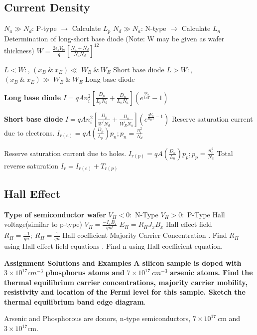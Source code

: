 \begin{multicols}{3}
\subsection{Current Density}
$N_a \gg N_d$: P-type $\rightarrow$ Calculate $L_p$ \hfill \break
$N_d \gg N_a$: N-type $\rightarrow$ Calculate $L_n$ \hfill \break
Determination of long-short base diode
(Note: W may be given as wafer thickness) $W=\frac{2\epsilon_s V_{bi	}}{q} \left[\frac{N_a+N_d}{N_aN_d}
\right]^{12}$ 

$L < W:$, $(x_B \ \&  \ x_E) \ll  \ W_B \ \& \ W_E $ Short base diode \hfill \break
$L > W:$, $(x_B \ \&  \ x_E)  \gg\ W_B \ \& \ W_E $ Long base diode %

\textbf{Long base diode} \hfill \break 
$I=qAn_i^2 \left[\frac{D_p}{L_p N_d}+\frac{D_n}{L_n N_a}\right] \left(e^{\frac{qV_a}{k_BT}}-1 \right)$ \hfill \break 

\textbf{Short base diode} \hfill \break 
$I=qAn_i^2 \left[\frac{D_p}{W^\prime N_d}+\frac{D_n}{W_E^\prime N_a}\right] \left(e^{\frac{qV_a}{k_BT}-1} \right)$ \hfill \break 
Reserve saturation current due to electrons. \hfill \break
$I_{r(e)}=qA\left(\frac{D_p}{L_p}\right)p_n; p_n=\frac{n_i^2}{N_d}$

Reserve saturation current due to holes. \hfill \break
$I_{r(p)}=qA\left(\frac{D_n}{L_n}\right)p_p; p_p=\frac{n_i^2}{N_a}$
Total reverse saturation \hfill \break 
$I_r=I_{r(e)}+T_{r(p)}$
\subsection{Hall Effect}
\textbf{Type of semiconductor wafer} \hfill \break
$V_H < 0:$ N-Type \hfill \break
$V_H > 0:$ P-Type \hfill \break
Hall voltage(similar to p-type) \hfill \break
$V_H=\frac{-I_xB_z}{qnt}$ \hfill \break
$E_H=R_HJ_xB_x$ Hall effect field \hfill \break
$R_H=\frac{-1}{qn}; \ R_H=\frac{1}{qn}$ Hall coefficient \hfill \break
Majority Carrier Concentration \hfill {}. Find $R_H$ using Hall effect field equations \hfill {}. Find n using Hall coefficient equation.

\textbf{Assignment Solutions and Examples} \hfill \break
	\textbf{A silicon sample is doped with} $3\times10^{17} cm^{-3}$ \textbf{phosphorus atoms and} $7\times 10^{17} \ cm^{-3}$ \textbf{arsenic atoms. Find the thermal equilibrium carrier concentrations, majority carrier mobility, resistivity and location of the Fermi level for this sample. Sketch the thermal equilibrium band edge diagram}.

Arsenic and Phosphorous are donors, n-type semiconductors, $7 \times 10^{17} \ \si{c \meter}$ and $3\times 10^{17}  \si{c \meter}$.


\end{multicols}
